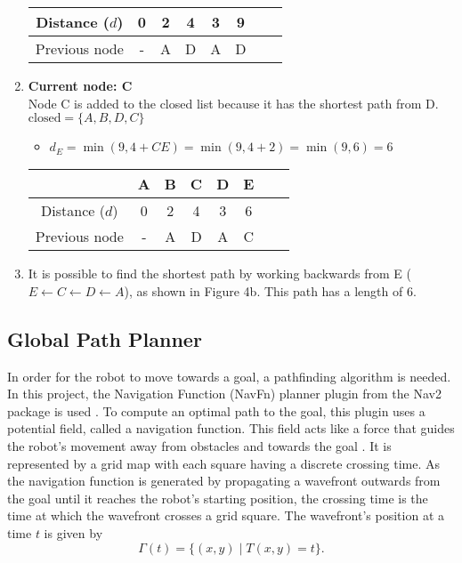 \begin{enumerate}
\begin{tabular}{ |c|c|c|c|c|c|c|c| }
              \hline
              Distance ($d$) & 0 & 2 & 4 & 3 & 9 \\
              \hline
              Previous node  & - & A & D & A & D \\
              \hline
          \end{tabular}
    \item \textbf{Current node: C}\\
          Node C is added to the closed list because it has the shortest path from D.\\
          $\text{closed} = \{A,B,D,C\}$
          \begin{itemize}
              \item $d_E=\min(9,4+CE)=\min(9,4+2)=\min(9,6)=6$
          \end{itemize}
          \def\arraystretch{1.5}
          \begin{tabular}{ |c|c|c|c|c|c|c|c| }
              \hline
                             & A & B & C & D & E \\
              \hline
              Distance ($d$) & 0 & 2 & 4 & 3 & 6 \\
              \hline
              Previous node  & - & A & D & A & C \\
              \hline
          \end{tabular}
    \item It is possible to find the shortest path by working backwards from E ($E \leftarrow C \leftarrow D \leftarrow A$), as shown in Figure 4b. This path has a length of 6.
\end{enumerate}

\subsection{Global Path Planner} \label{global-planner}
In order for the robot to move towards a goal, a pathfinding algorithm is needed. In this project, the Navigation Function (NavFn) planner plugin from the Nav2 package is used \parencite{NavFnPlannerNav2}. To compute an optimal path to the goal, this plugin uses a potential field, called a navigation function. This field acts like a force that guides the robot's movement away from obstacles and towards the goal \parencite{philippsenInterpolatedDynamicNavigation2005}. It is represented by a grid map with each square having a discrete crossing time. As the navigation function is generated by propagating a wavefront outwards from the goal until it reaches the robot's starting position, the crossing time is the time at which the wavefront crosses a grid square. The wavefront's position at a time $t$ is given by
\[
    \Gamma (t)=\{(x,y) \mid T(x,y)=t\}.
\]

